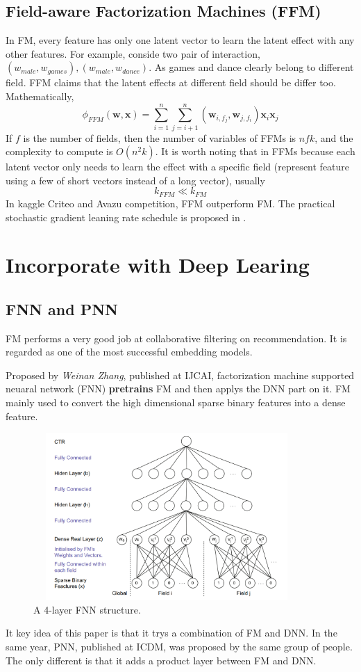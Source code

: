 \documentclass{article}
\begin{document}
\subsection{Field-aware Factorization Machines (FFM)}
In FM, every feature has only one latent vector to learn the latent effect with any other features. For example, conside two pair of interaction, $(w_{male},w_{games}), (w_{male},w_{dance})$. As games and dance clearly belong to different field. FFM \cite{DBLP:conf/recsys/JuanZCL16}
claims that the latent effects at different field should be differ too.
Mathematically,
$$\phi_{FFM}(\textbf{w},\textbf{x})=\sum_{i=1}^{n} \sum_{j=i+1}^{n}(\textbf{w}_{i,f_{j}},\textbf{w}_{j,f_{i}})\textbf{x}_{i} \textbf{x}_{j}$$
If $f$ is the number of fields, then the number of variables of
FFMs is $nfk$, and the complexity to compute is $O(n^{2}k)$. It is worth noting that in FFMs because each latent vector only needs to learn the effect with a specific field (represent feature using a few of short vectors instead of a long vector), usually
$$k_{FFM} \ll k_{FM}$$
In kaggle Criteo and Avazu competition, FFM outperform FM. The practical stochastic gradient leaning rate schedule is proposed in \cite{DBLP:conf/pakdd/ChinZJL15}. 


\section{Incorporate with Deep Learing}
\subsection{FNN and PNN}
FM performs a very good job at collaborative filtering on recommendation. It is regarded as one of the most successful embedding models.

Proposed by  \textsl{Weinan Zhang}, published at IJCAI, factorization machine supported neuaral network (FNN) \textbf{pretrains} FM  and then applys the DNN part on it. FM mainly used to convert the high dimensional sparse binary features into a dense feature.
\begin{figure}[H]
\centering
\includegraphics[width=4in,height=2.5in]{fnn}
\caption{A 4-layer FNN structure.}
\end{figure}
It key idea of this paper is that it trys a combination of FM and DNN. In the same year, PNN\cite{DBLP:conf/icdm/QuCRZYWW16}, published at ICDM, was proposed by the same group of people. The only different is that it adds a product layer between FM and DNN.
\end{document}
